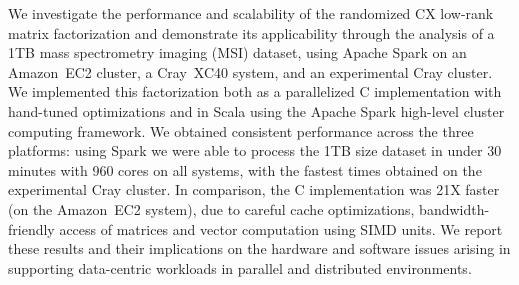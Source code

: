 We investigate the performance and scalability of the randomized CX low-rank matrix factorization and demonstrate its applicability through the analysis of a 1TB mass spectrometry imaging (MSI) dataset, using Apache Spark on an Amazon~EC2 cluster, a Cray~XC40 system, and an experimental Cray cluster. We implemented this factorization both as a parallelized C implementation with hand-tuned optimizations and in Scala using the Apache Spark high-level cluster computing framework. We obtained consistent performance across the three platforms: using Spark we were able to process the 1TB size dataset in under 30 minutes with 960 cores on all systems, with the fastest times obtained on the experimental Cray cluster. In comparison, the C implementation was 21X faster (on the Amazon~EC2 system), due to careful cache optimizations, bandwidth-friendly access of matrices and vector computation using SIMD units. We report these results and their implications on the hardware and software issues arising in supporting data-centric workloads in parallel and distributed environments.
